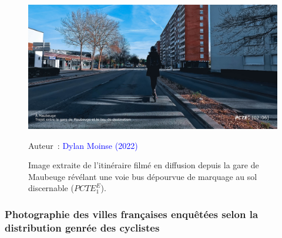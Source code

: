 \begin{refsegment}
    \begin{figure}[h!]\vspace*{4pt}
        \caption{Image extraite de l'itinéraire filmé en diffusion depuis la gare de Maubeuge révélant une voie bus dépourvue de marquage au sol discernable (\(PCTE^{E}_{1}\)).}
        \label{fig-chap4:pcte1e-voie-bus}
        \centerline{\includegraphics[width=1\columnwidth]{src/Figures/Chap-4/Extrait_Video_PCTE1_Egress_4.jpg}}
        \vspace{5pt}
        \begin{flushright}\scriptsize{
        Auteur~: \textcolor{blue}{Dylan Moinse (2022)}
        }\end{flushright}
    \end{figure}

\subsubsection*{Photographie des villes françaises enquêtées selon la distribution genrée des cyclistes
    \label{chap4:comparaison-villes-fr-genre}
    }


\end{refsegment}
